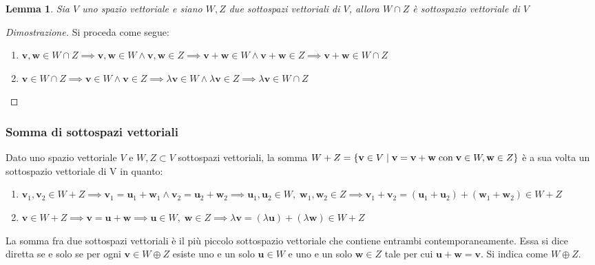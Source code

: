 \documentclass{article}
\newtheorem{lemma}{Lemma}
\begin{document}
    \vspace{10pt}
    \begin{lemma}
       Sia $V$ uno spazio vettoriale e siano $W, Z$ due sottospazi vettoriali di $V$, allora $W \cap Z$ è sottospazio vettoriale di $V$ 
    \end{lemma}
    \begin{proof}[Dimostrazione]
        Si proceda come segue:
        \begin{enumerate}[label=(\Roman*)]
            \item $\mathbf{v}, \mathbf{w} \in W \cap Z \implies \mathbf{v}, \mathbf{w} \in W \land \mathbf{v}, \mathbf{w} \in Z \implies \mathbf{v} + \mathbf{w} \in W \land \mathbf{v} + \mathbf{w} \in Z \implies \mathbf{v} + \mathbf{w} \in W \cap Z$
            \item $\mathbf{v} \in W \cap Z \implies \mathbf{v} \in W \land \mathbf{v} \in Z \implies \lambda \mathbf{v} \in W \land \lambda \mathbf{v} \in Z \implies \lambda \mathbf{v} \in W \cap Z$
        \end{enumerate}
    \end{proof}

    \subsubsection{Somma di sottospazi vettoriali} \label{subsubsec:vsdirect}
    Dato uno spazio vettoriale $V$ e $W, Z \subset V$ sottospazi vettoriali, la somma $W + Z = \{\mathbf{v} \in V \; | \; \mathbf{v} = \mathbf{v} + \mathbf{w} \; \textnormal{con} \; \mathbf{v} \in W, \mathbf{w} \in Z\}$ è a sua volta un sottospazio vettoriale di V in quanto:
    \begin{enumerate}[label=(\arabic*)]
        \item $\mathbf{v}_{1}, \mathbf{v}_{2} \in W + Z \implies \mathbf{v}_{1} = \mathbf{u}_{1} + \mathbf{w}_{1} \land \mathbf{v}_{2} = \mathbf{u}_{2} + \mathbf{w}_{2} \implies \mathbf{u}_{1}, \mathbf{u}_{2} \in W, \; \mathbf{w}_{1}, \mathbf{w}_{2} \in Z \implies \mathbf{v}_{1} + \mathbf{v}_{2} = (\mathbf{u}_{1} + \mathbf{u}_{2}) + (\mathbf{w}_{1} + \mathbf{w}_{2}) \in W + Z$
        \item $\mathbf{v} \in W + Z \implies \mathbf{v} = \mathbf{u} + \mathbf{w} \implies \mathbf{u} \in W, \; \mathbf{w} \in Z \implies \lambda \mathbf{v} = (\lambda \mathbf{u}) + (\lambda \mathbf{w}) \in W + Z$
    \end{enumerate}
    La somma fra due sottospazi vettoriali è il più piccolo sottospazio vettoriale che contiene entrambi contemporaneamente. Essa si dice diretta se e solo se per ogni $\mathbf{v} \in W \oplus Z$ esiste uno e un solo $\mathbf{u} \in W$ e uno e un solo $\mathbf{w} \in Z$ tale per cui 
    $\mathbf{u} + \mathbf{w} = \mathbf{v}$. Si indica come $W \oplus Z$.
\end{document}
